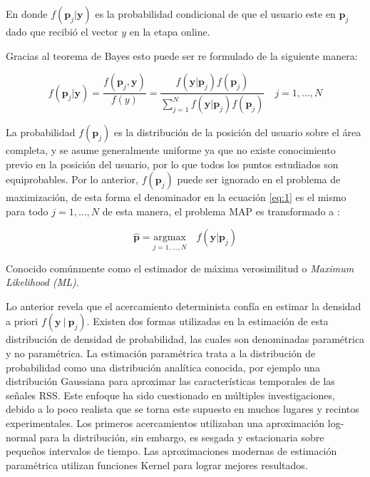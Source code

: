 \begin{enumerate}
 En donde \( f( \textbf{p}_{j} \vert \textbf{y}) \) es la probabilidad condicional de que el usuario este en \(\textbf{p}_{j}\) dado que recibió el vector \( y \) en la etapa online.
 
Gracias al teorema de Bayes esto puede ser re formulado de la siguiente manera:

\begin{equation} \label{eq:1}
 f( \textbf{p}_{j} \vert \textbf{y}) = \frac{f( \textbf{p}_{j} , \textbf{y})}{f(y)} = \frac{f( \textbf{y} \vert \textbf{p}_{j}) f(\textbf{p}_{j})} {\sum_{j=1}^{N} f( \textbf{y} \vert \textbf{p}_{j}) f(\textbf{p}_{j})} \quad j = 1, ..., N 
\end{equation}

La probabilidad \(f(\textbf{p}_{j})\) es la distribución de la posición del usuario sobre el área completa, y se asume generalmente uniforme ya que no existe conocimiento previo en la posición del usuario, por lo que todos los puntos estudiados son equiprobables. Por lo anterior, \(f(\textbf{p}_{j})\) puede ser ignorado en el problema de maximización, de esta forma el denominador en la ecuación \ref{eq:1} es el mismo para todo \( j= 1, ..., N\) de esta manera, el problema MAP es transformado a :

\begin{equation}
\hat{\textbf{p}} = \underset{j=1,...,N}{\mathrm{argmax}} \quad f( \textbf{y}  \vert \textbf{p}_{j})
\end{equation}


Conocido comúnmente como el estimador de máxima verosimilitud o \textit{Maximum Likelihood (ML)}. 

Lo anterior revela que el acercamiento determinista confía en estimar la densidad a priori \(f( \textbf{y} \ \vert \ \textbf{p}_{j})\). Existen dos formas utilizadas en la estimación de esta distribución de densidad de probabilidad, las cuales son denominadas paramétrica y no paramétrica. La estimación paramétrica trata a la distribución de probabilidad como una distribución analítica conocida, por ejemplo una distribución Gaussiana \citep{Haeberlen:2004:PRL:1023720.1023728} para aproximar las características temporales de las señales RSS. Este enfoque ha sido cuestionado en múltiples investigaciones, debido a lo poco realista que se torna este supuesto en muchos lugares y recintos experimentales. Los primeros acercamientos utilizaban una aproximación log-normal para la distribución, sin embargo, es sesgada y estacionaria sobre pequeños intervalos de tiempo.  Las aproximaciones modernas de estimación paramétrica utilizan funciones Kernel para lograr mejores resultados. 


\end{enumerate}
